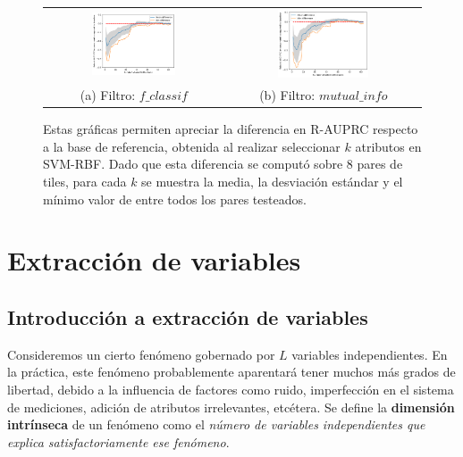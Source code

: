 \begin{figure}[h!]
\begin{tabular}{cc}
  \includegraphics[width=0.49\textwidth]{Kap5/rbfBEST_K_f_classif.png} &   \includegraphics[width=0.49\textwidth]{Kap5/rbfBEST_K_mutual_info_classif.png} \\
(a) Filtro: $f\_classif$ & (b) Filtro: $mutual\_info$
\end{tabular}
\caption{Estas gráficas permiten apreciar la diferencia en R-AUPRC respecto a la base de referencia, obtenida al realizar seleccionar $k$ atributos en SVM-RBF. Dado que esta diferencia se computó sobre 8 pares de tiles, para cada $k$ se muestra la media, la desviación estándar y el mínimo valor de entre todos los pares testeados. }
\label{fig:optimal_k_svmk}
\end{figure}

\section{Extracción de variables}

\subsection{Introducción a extracción de variables}

Consideremos un cierto fenómeno gobernado por $L$ variables independientes. En la práctica, este fenómeno probablemente aparentará tener muchos más grados de libertad, debido a la influencia de factores como ruido, imperfección en el sistema de mediciones, adición de atributos irrelevantes, etcétera. Se define la \textbf{dimensión intrínseca} de un fenómeno como el \textit{número de variables independientes que explica satisfactoriamente ese 
fenómeno}\cite{carreira}. \\

